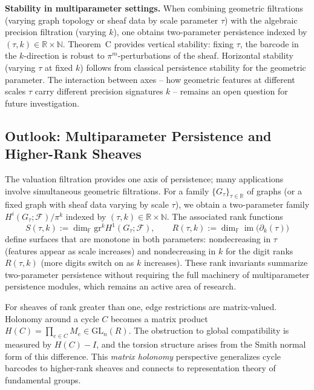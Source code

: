 \documentclass[11pt]{amsart}
\theoremstyle{plain}
\theoremstyle{definition}
\newcommand{\Ring}{R}                          %
\newcommand{\unif}{\pi}                        %
\newcommand{\sheaf}[1]{\mathcal{#1}}                  %
\newcommand{\Digit}[1]{\partial_{#1}}%
\newcommand{\gr}{\mathrm{gr}}                         %
\DeclareMathOperator{\im}{im}                         %
\begin{document}
\textbf{Stability in multiparameter settings.}
When combining geometric filtrations (varying graph topology or sheaf data by scale parameter $\tau$) with the algebraic precision filtration (varying $k$), one obtains two-parameter persistence indexed by $(\tau, k) \in \mathbb{R} \times \mathbb{N}$. Theorem~C provides vertical stability: fixing $\tau$, the barcode in the $k$-direction is robust to $\unif^m$-perturbations of the sheaf. Horizontal stability (varying $\tau$ at fixed $k$) follows from classical persistence stability for the geometric parameter. The interaction between axes -- how geometric features at different scales $\tau$ carry different precision signatures $k$ -- remains an open question for future investigation.

\subsection{Outlook: Multiparameter Persistence and Higher-Rank Sheaves}
\label{ssec:barcode-outlook}

The valuation filtration provides one axis of persistence; many applications involve simultaneous geometric filtrations. For a family $\{G_\tau\}_{\tau \in \mathbb{R}}$ of graphs (or a fixed graph with sheaf data varying by scale $\tau$), we obtain a two-parameter family $H^i(G_\tau; \sheaf{F})/\unif^k$ indexed by $(\tau, k) \in \mathbb{R} \times \mathbb{N}$. The associated rank functions
\[
S(\tau, k) := \dim_{\mathbb{F}} \gr^k H^1(G_\tau;\sheaf{F}), \qquad R(\tau, k) := \dim_{\mathbb{F}} \im\bigl(\Digit{k}(\tau)\bigr)
\]
define surfaces that are monotone in both parameters: nondecreasing in $\tau$ (features appear as scale increases) and nondecreasing in $k$ for the digit ranks $R(\tau,k)$ (more digits switch on as $k$ increases). These rank invariants summarize two-parameter persistence without requiring the full machinery of multiparameter persistence modules, which remains an active area of research.

For sheaves of rank greater than one, edge restrictions are matrix-valued. Holonomy around a cycle $C$ becomes a matrix product $H(C) = \prod_{e \in C} M_e \in \mathrm{GL}_n(\Ring)$. The obstruction to global compatibility is measured by $H(C) - I$, and the torsion structure arises from the Smith normal form of this difference. This \emph{matrix holonomy} perspective generalizes cycle barcodes to higher-rank sheaves and connects to representation theory of fundamental groups.
\end{document}
